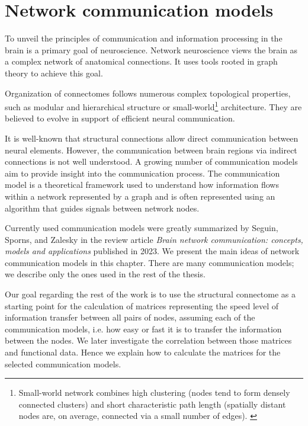 \chapter{Network communication models}\label{ch:networks}

To unveil the principles of communication and information processing in the brain is a primary goal of neuroscience. Network neuroscience views the brain as a complex network of anatomical connections. It uses tools rooted in graph theory to achieve this goal.  

Organization of connectomes follows numerous complex topological properties, such as modular and hierarchical structure or small-world\footnote{Small-world network combines high clustering (nodes tend to form densely connected clusters) and short characteristic path length (spatially distant nodes are, on average, connected via a small number of edges). \cite{seguin_brain_2023}} architecture. They are believed to evolve in support of efficient neural communication. \cite{seguin_brain_2023,avena-koenigsberger_communication_2018}

It is well-known that structural connections allow direct communication between neural elements. However, the communication between brain regions via indirect connections is not well understood. A growing number of communication models aim to provide insight into the communication process. The communication model is a theoretical framework used to understand how information flows within a network represented by a graph and is often represented using an algorithm that guides signals between network nodes. \cite{seguin_brain_2023}

Currently used communication models were greatly summarized by Seguin, Sporns, and Zalesky in the review article \textit{Brain network communication: concepts, models and applications} published in 2023. \cite{seguin_brain_2023} We present the main ideas of network communication models in this chapter. There are many communication models; we describe only the ones used in the rest of the thesis.

Our goal regarding the rest of the work is to use the structural connectome as a starting point for the calculation of matrices representing the speed level of information transfer between all pairs of nodes, assuming each of the communication models, i.e. how easy or fast it is to transfer the information between the nodes. We later investigate the correlation between those matrices and functional data. Hence we explain how to calculate the matrices for the selected communication models.

